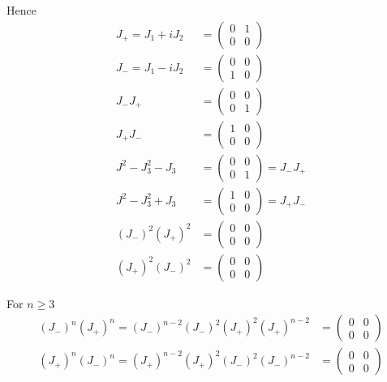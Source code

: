 Hence
\begin{align*}
J_+=J_1+iJ_2&=\begin{pmatrix}0&1\\0&0\end{pmatrix}
\\
J_-=J_1-iJ_2&=\begin{pmatrix}0&0\\1&0\end{pmatrix}
\\
J_-J_+&=\begin{pmatrix}0&0\\0&1\end{pmatrix}
\\
J_+J_-&=\begin{pmatrix}1&0\\0&0\end{pmatrix}
\\
J^2-J_3^2-J_3&=\begin{pmatrix}0&0\\0&1\end{pmatrix}=J_-J_+
\\
J^2-J_3^2+J_3&=\begin{pmatrix}1&0\\0&0\end{pmatrix}=J_+J_-
\\
(J_-)^2(J_+)^2&=\begin{pmatrix}0&0\\0&0\end{pmatrix}
\\
(J_+)^2(J_-)^2&=\begin{pmatrix}0&0\\0&0\end{pmatrix}
\end{align*}

For $n\ge3$
\begin{align*}
(J_-)^n(J_+)^n=(J_-)^{n-2}(J_-)^2(J_+)^2(J_+)^{n-2}&=\begin{pmatrix}0&0\\0&0\end{pmatrix}
\\
(J_+)^n(J_-)^n=(J_+)^{n-2}(J_+)^2(J_-)^2(J_-)^{n-2}&=\begin{pmatrix}0&0\\0&0\end{pmatrix}
\end{align*}


